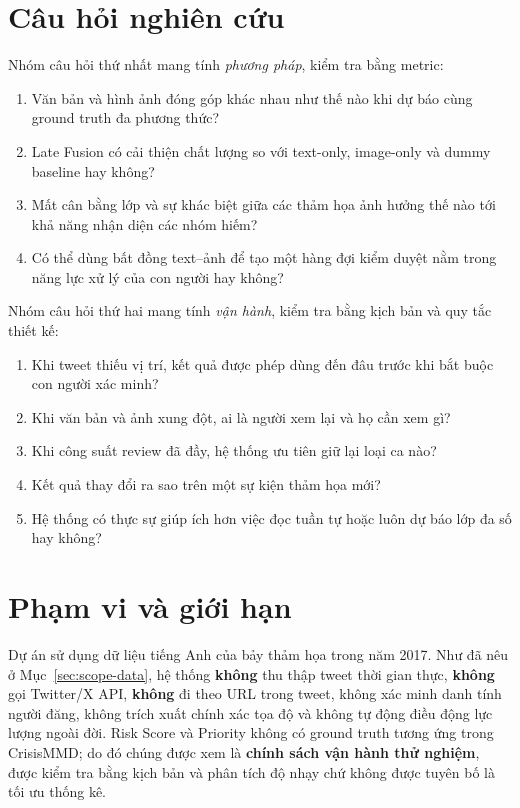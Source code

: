 \section{Câu hỏi nghiên cứu}

Nhóm câu hỏi thứ nhất mang tính \emph{phương pháp}, kiểm tra bằng metric:

\begin{enumerate}[leftmargin=*]
  \item Văn bản và hình ảnh đóng góp khác nhau như thế nào khi dự báo cùng
        ground truth đa phương thức?
  \item Late Fusion có cải thiện chất lượng so với text-only, image-only và
        dummy baseline hay không?
  \item Mất cân bằng lớp và sự khác biệt giữa các thảm họa ảnh hưởng thế nào tới
        khả năng nhận diện các nhóm hiếm?
  \item Có thể dùng bất đồng text--ảnh để tạo một hàng đợi kiểm duyệt nằm trong
        năng lực xử lý của con người hay không?
\end{enumerate}

Nhóm câu hỏi thứ hai mang tính \emph{vận hành}, kiểm tra bằng kịch bản và quy
tắc thiết kế:

\begin{enumerate}[leftmargin=*,resume]
  \item Khi tweet thiếu vị trí, kết quả được phép dùng đến đâu trước khi bắt buộc
        con người xác minh?
  \item Khi văn bản và ảnh xung đột, ai là người xem lại và họ cần xem gì?
  \item Khi công suất review đã đầy, hệ thống ưu tiên giữ lại loại ca nào?
  \item Kết quả thay đổi ra sao trên một sự kiện thảm họa mới?
  \item Hệ thống có thực sự giúp ích hơn việc đọc tuần tự hoặc luôn dự báo lớp
        đa số hay không?
\end{enumerate}

\section{Phạm vi và giới hạn}

Dự án sử dụng dữ liệu tiếng Anh của bảy thảm họa trong năm 2017. Như đã nêu ở
Mục~\ref{sec:scope-data}, hệ thống \textbf{không} thu thập tweet thời gian thực,
\textbf{không} gọi Twitter/X API, \textbf{không} đi theo URL trong tweet, không
xác minh danh tính người đăng, không trích xuất chính xác tọa độ và không tự
động điều động lực lượng ngoài đời. Risk Score và Priority không có ground truth
tương ứng trong CrisisMMD; do đó chúng được xem là \textbf{chính sách vận hành
thử nghiệm}, được kiểm tra bằng kịch bản và phân tích độ nhạy chứ không được
tuyên bố là tối ưu thống kê.

